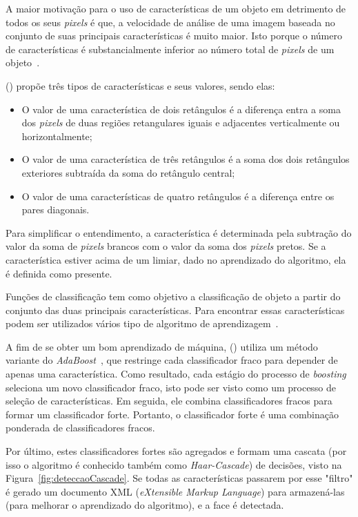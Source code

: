 A maior motivação para o uso de características de um objeto em detrimento de todos os seus \textit{pixels} é que, a velocidade de análise de uma imagem baseada no conjunto de suas principais características é muito maior. Isto porque o número de características é substancialmente inferior ao número total de \textit{pixels} de um objeto~\cite{peixoto2012deteccao}.

\citeauthor{viola2001rapid} (\citeyear{viola2001rapid}) propõe três tipos de características e seus valores, sendo elas:
\begin{itemize}
    \item O valor de uma característica de dois retângulos é a diferença entra a soma dos \textit{pixels} de duas regiões retangulares iguais e adjacentes verticalmente ou horizontalmente;
    \item O valor de uma característica de três retângulos é a soma dos dois retângulos exteriores subtraída da soma do retângulo central;
    \item O valor de uma características de quatro retângulos é a diferença entre os pares diagonais.
\end{itemize}

Para simplificar o entendimento, a característica é determinada pela subtração do valor da soma de \textit{pixels} brancos com o valor da soma dos \textit{pixels} pretos. Se a característica estiver acima de um limiar, dado no aprendizado do algoritmo, ela é definida como presente.

Funções de classificação tem como objetivo a classificação de objeto a partir do conjunto das duas principais características. Para encontrar essas características podem ser utilizados vários tipo de algoritmo de aprendizagem~\cite{peixoto2012deteccao}.

A fim de se obter um bom aprendizado de máquina, \citeauthor{viola2001rapid} (\citeyear{viola2001rapid}) utiliza um método variante do \textit{AdaBoost}~\cite{freund1999short}, que restringe cada classificador fraco para depender de apenas uma característica. Como resultado, cada estágio do processo de \textit{boosting} seleciona um novo classificador fraco, isto pode ser visto como um processo de seleção de características. Em seguida, ele combina classificadores fracos para formar um classificador forte. Portanto, o classificador forte é uma combinação ponderada de classificadores fracos.

Por último, estes classificadores fortes são agregados e formam uma cascata (por isso o algoritmo é conhecido também como \textit{Haar-Cascade}) de decisões, visto na Figura~\ref{fig:deteccaoCascade}. Se todas as características passarem por esse "filtro" é gerado um documento XML (\textit{eXtensible Markup Language}) para armazená-las (para melhorar o aprendizado do algoritmo), e a face é detectada.

